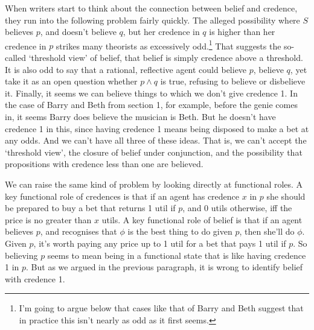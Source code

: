 When writers start to think about the connection between belief and credence, they run into the following problem fairly quickly. The alleged possibility where \(S\) believes \(p\), and doesn't believe \(q\), but her credence in \(q\) is higher than her credence in \(p\) strikes many theorists as excessively odd.\footnote{I'm going to argue below that cases like that of Barry and Beth suggest that in practice this isn't nearly as odd as it first seems.} That suggests the so-called `threshold view' of belief, that belief is simply credence above a threshold. It is also odd to say that a rational, reflective agent could believe \(p\), believe \(q\), yet take it as an open question whether \(p \wedge q\) is true, refusing to believe or disbelieve it. Finally, it seems we can believe things to which we don't give credence 1. In the case of Barry and Beth from section 1, for example, before the genie comes in, it seems Barry does believe the musician is Beth. But he doesn't have credence 1 in this, since having credence 1 means being disposed to make a bet at any odds. And we can't have all three of these ideas. That is, we can't accept the `threshold view', the closure of belief under conjunction, and the possibility that propositions with credence less than one are believed.

We can raise the same kind of problem by looking directly at functional roles. A key functional role of credences is that if an agent has credence \(x\) in \(p\) she should be prepared to buy a bet that returns 1 util if \(p\), and 0 utils otherwise, iff the price is no greater than \(x\) utils. A key functional role of belief is that if an agent believes \(p\), and recognises that \(\phi\) is the best thing to do given \(p\), then she'll do \(\phi\). Given \(p\), it's worth paying any price up to 1 util for a bet that pays 1 util if \(p\). So believing \(p\) seems to mean being in a functional state that is like having credence 1 in \(p\). But as we argued in the previous paragraph, it is wrong to identify belief with credence 1.

